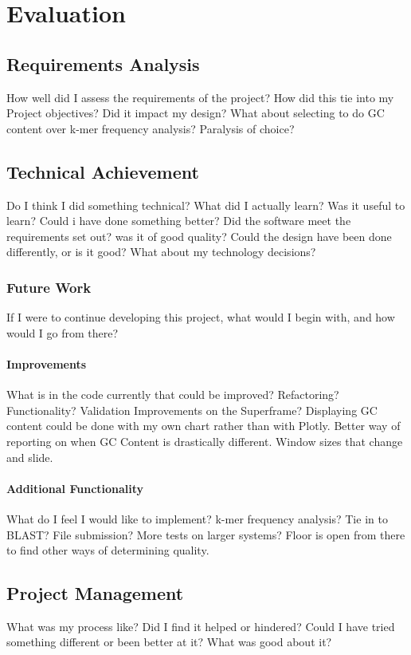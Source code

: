 \chapter{Evaluation}

\section{Requirements Analysis}
How well did I assess the requirements of the project? How did this tie into my Project objectives? Did it impact my design? What about selecting to do GC content over k-mer frequency analysis? Paralysis of choice?

\section{Technical Achievement}
Do I think I did something technical? What did I actually learn? Was it useful to learn? Could i have done something better? Did the software meet the requirements set out? was it of good quality? Could the design have been done differently, or is it good? What about my technology decisions?

\subsection{Future Work}
If I were to continue developing this project, what would I begin with, and how would I go from there? 
\subsubsection{Improvements}
What is in the code currently that could be improved? Refactoring? Functionality? Validation
Improvements on the Superframe? Displaying GC content could be done with my own chart rather than with Plotly. Better way of reporting on when GC Content is drastically different. Window sizes that change and slide.
\subsubsection{Additional Functionality}
What do I feel I would like to implement? k-mer frequency analysis? Tie in to BLAST? File submission? More tests on larger systems? Floor is open from there to find other ways of determining quality.

\section{Project Management}
What was my process like? Did I find it helped or hindered? Could I have tried something different or been better at it? What was good about it?

